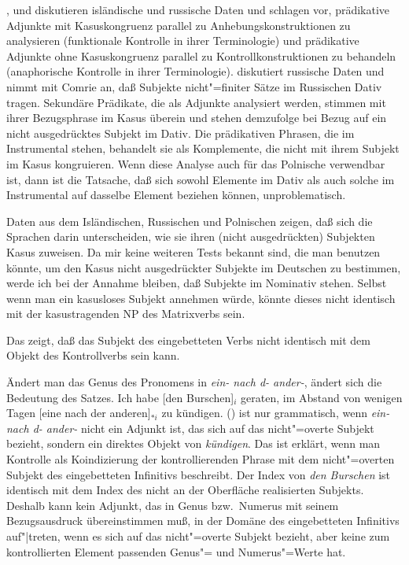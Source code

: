 {%
% 
        \citet{Andrews82b}, \citet{Neidle82a} und 
        \citet[]{Bresnan82c} diskutieren isländische und
        russische Daten und schlagen vor, prädikative Adjunkte mit Kasuskongruenz
        parallel zu Anhebungskonstruktionen zu analysieren (funktionale Kontrolle
        in ihrer Terminologie) und prädikative Adjunkte ohne Kasuskongruenz parallel zu
        Kontrollkonstruktionen zu behandeln (anaphorische Kontrolle
        in ihrer Terminologie).
        \citet[]{Neidle82a} diskutiert russische Daten und nimmt mit Comrie
        an, daß Subjekte nicht"=finiter Sätze im Russischen Dativ tragen. Sekundäre Prädikate,
        die als Adjunkte analysiert werden, stimmen mit ihrer Bezugsphrase im Kasus überein und
        stehen demzufolge bei Bezug auf ein nicht ausgedrücktes Subjekt im Dativ. Die prädikativen
        Phrasen, die im Instrumental stehen, behandelt sie als Komplemente, die nicht mit
        ihrem Subjekt im Kasus kongruieren. Wenn diese Analyse auch für das Polnische verwendbar
        ist, dann ist die Tatsache, daß sich sowohl Elemente im Dativ als auch solche im Instrumental
        auf dasselbe Element beziehen können, unproblematisch.

        Daten aus dem Isländischen, Russischen und Polnischen zeigen, daß sich die Sprachen darin unterscheiden, wie sie
        ihren (nicht ausgedrückten) Subjekten Kasus zuweisen. Da mir keine weiteren
        Tests bekannt sind, die man benutzen könnte, um den Kasus nicht ausgedrückter Subjekte
        im Deutschen zu bestimmen, werde ich bei der Annahme bleiben, daß Subjekte im Nominativ
        stehen.
        Selbst wenn man ein kasusloses Subjekt annehmen würde, könnte dieses nicht identisch
        mit der kasustragenden NP des Matrixverbs sein.
}
Das zeigt, daß das Subjekt des eingebetteten Verbs nicht identisch mit dem Objekt des Kontrollverbs
sein kann.

Ändert man das Genus des Pronomens in {\em ein- nach d- ander-}, ändert sich die Bedeutung des Satzes.
\ea
Ich habe [den Burschen]$_i$ geraten, im Abstand von wenigen Tagen [eine nach der an\-de\-ren]$_{*i}$ zu kündigen.
\z
() ist nur grammatisch, wenn {\em ein- nach d- ander-} nicht ein Adjunkt ist, das 
sich auf das nicht"=overte Subjekt bezieht, sondern ein direktes Objekt von \emph{kündigen}.
Das ist erklärt, wenn man Kontrolle als Koindizierung der kontrollierenden Phrase mit dem nicht"=overten
Subjekt des eingebetteten Infinitivs beschreibt. Der Index von \emph{den Burschen} ist identisch
mit dem Index des nicht an der Oberfläche realisierten Subjekts. Deshalb kann kein Adjunkt,
das
in Genus bzw.\ Numerus mit seinem Bezugsausdruck übereinstimmen muß, in der Domäne
des eingebetteten Infinitivs auf"|treten, wenn es sich auf das nicht"=overte Subjekt bezieht,
aber keine zum kontrollierten Element passenden Genus"= und Numerus"=Werte hat.%

